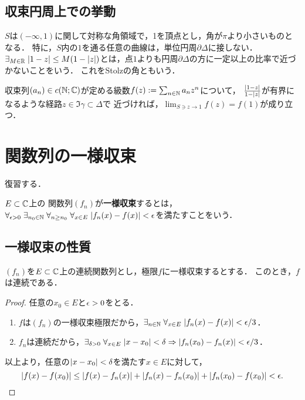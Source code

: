 \documentclass[uplatex, dvipdfmx]{jsreport}
\begin{document}
\subsection{収束円周上での挙動}

\begin{tcolorbox}[colframe=ForestGreen, colback=ForestGreen!10!white,breakable,colbacktitle=ForestGreen!40!white,coltitle=black,fonttitle=\bfseries\sffamily,
title=]
    $S$は$(-\infty,1)$に関して対称な角領域で，1を頂点とし，角が$\pi$より小さいものとなる．
    特に，$S$内の$1$を通る任意の曲線は，単位円周$\partial\Delta$に接しない．
    $\exists_{M\in\mathbb{R}}\;\lvert1-z\rvert\le M(1-\lvert z\rvert)$とは，点$1$よりも円周$\partial\Delta$の方に一定以上の比率で近づかないことをいう．
    これをStolzの角ともいう．
\end{tcolorbox}

\begin{theorem}[Abel 2]
    収束列$(a_n)\in c(\mathbb{N};\mathbb{C})$が定める級数$f(z):=\sum_{n\in\mathbb{N}}a_nz^n$について，
    $\frac{\lvert1-z\rvert}{1-\lvert z\rvert}$が有界になるような経路$z\in\Im\gamma\subset\Delta$で
    近づければ，$\lim_{S\ni z\to1}f(z)=f(1)$が成り立つ．
\end{theorem}

\section{関数列の一様収束}

\begin{tcolorbox}[colframe=ForestGreen, colback=ForestGreen!10!white,breakable,colbacktitle=ForestGreen!40!white,coltitle=black,fonttitle=\bfseries\sffamily,
title=]
    復習する．
\end{tcolorbox}

\begin{definition}
    $E\subset\mathbb{C}$上の
    関数列$(f_n)$が\textbf{一様収束}するとは，$\forall_{\epsilon>0}\;\exists_{n_0\in\mathbb{N}}\;\forall_{n\ge n_0}\;\forall_{x\in E}\;\lvert f_n(x)-f(x)\rvert<\epsilon$を満たすことをいう．
\end{definition}

\subsection{一様収束の性質}

\begin{theorem}[一様収束は連続性を保つ]
    $(f_n)$を$E\subset\mathbb{C}$上の連続関数列とし，極限$f$に一様収束するとする．
    このとき，$f$は連続である．
\end{theorem}
\begin{proof}
    任意の$x_0\in E$と$\epsilon>0$をとる．
    \begin{enumerate}
        \item $f$は$(f_n)$の一様収束極限だから，$\exists_{n\in\mathbb{N}}\;\forall_{x\in E}\;\lvert f_n(x)-f(x)\rvert<\epsilon/3$．
        \item $f_n$は連続だから，$\exists_{\delta>0}\;\forall_{x\in E}\;\lvert x-x_0\rvert<\delta\Rightarrow\lvert f_n(x_0)-f_n(x)\rvert<\epsilon/3$．
    \end{enumerate}
    以上より，任意の$\lvert x-x_0\rvert<\delta$を満たす$x\in E$に対して，
    \[\lvert f(x)-f(x_0)\rvert\le\lvert f(x)-f_n(x)\rvert+\lvert f_n(x)-f_n(x_0)\rvert+\lvert f_n(x_0)-f(x_0)\rvert<\epsilon.\]
\end{proof}
\end{document}
